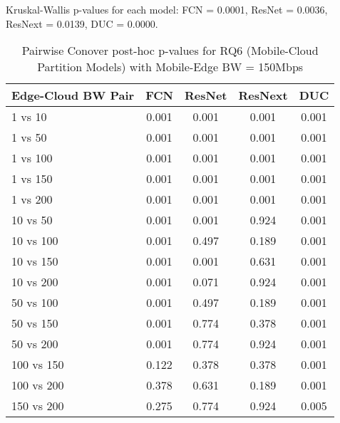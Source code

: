 \begin{table}[h]
\centering
\caption{Pairwise Conover post-hoc p-values for RQ6 (Mobile-Cloud Partition Models) with Mobile-Edge BW = 150Mbps}
\label{tab:conover_mobile_cloud_partition_me150}
\smallskip
Kruskal-Wallis p-values for each model: FCN = 0.0001, ResNet = 0.0036, ResNext = 0.0139, DUC = 0.0000.

\begin{tabular}{lcccc}
\toprule
Edge-Cloud BW Pair & FCN & ResNet & ResNext & DUC \\
\midrule
1 vs 10 & 0.001 & 0.001 & 0.001 & 0.001 \\
1 vs 50 & 0.001 & 0.001 & 0.001 & 0.001 \\
1 vs 100 & 0.001 & 0.001 & 0.001 & 0.001 \\
1 vs 150 & 0.001 & 0.001 & 0.001 & 0.001 \\
1 vs 200 & 0.001 & 0.001 & 0.001 & 0.001 \\
10 vs 50 & 0.001 & 0.001 & 0.924 & 0.001 \\
10 vs 100 & 0.001 & 0.497 & 0.189 & 0.001 \\
10 vs 150 & 0.001 & 0.001 & 0.631 & 0.001 \\
10 vs 200 & 0.001 & 0.071 & 0.924 & 0.001 \\
50 vs 100 & 0.001 & 0.497 & 0.189 & 0.001 \\
50 vs 150 & 0.001 & 0.774 & 0.378 & 0.001 \\
50 vs 200 & 0.001 & 0.774 & 0.924 & 0.001 \\
100 vs 150 & 0.122 & 0.378 & 0.378 & 0.001 \\
100 vs 200 & 0.378 & 0.631 & 0.189 & 0.001 \\
150 vs 200 & 0.275 & 0.774 & 0.924 & 0.005 \\
\bottomrule
\end{tabular}
\end{table}

